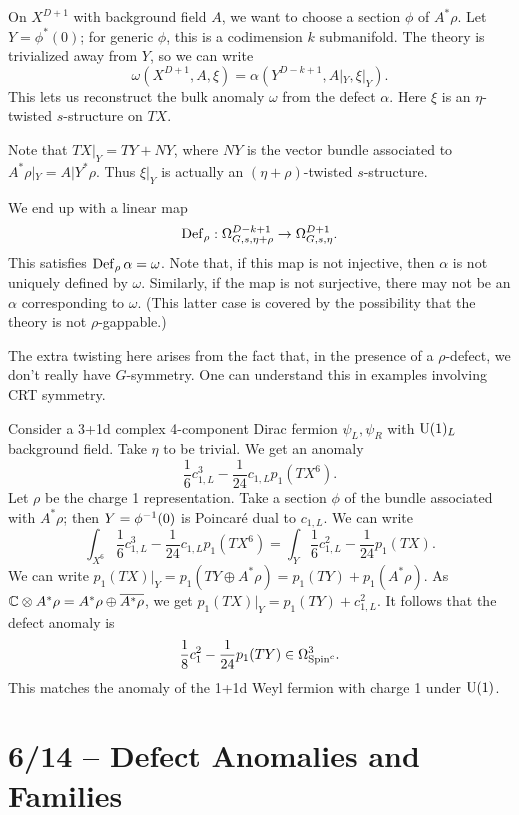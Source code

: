 On $X^{D+1}$ with background field $A$, we want to choose a section $\phi$ of $A^*\rho$.
Let $Y = \phi^*(0)$; for generic $\phi$, this is a codimension $k$ submanifold.
The theory is trivialized away from $Y$, so we can write
\[
	\omega(X^{D+1}, A, \xi) = \alpha(Y^{D-k+1}, A|_Y, \xi|_Y).
\]
This lets us reconstruct the bulk anomaly $\omega$ from the defect $\alpha$.
Here $\xi$ is an $\eta$-twisted $s$-structure on $TX$.

Note that $TX|_Y = TY + NY$, where $NY$ is the vector bundle associated to $A^*\rho|_Y = A|Y^* \rho$.
Thus $\xi|_Y$ is actually an $(\eta + \rho)$-twisted $s$-structure.

We end up with a linear map
\[
	\operatorname{Def}_\rho: \Omega^{D-k+1}_{G,s,\eta+\rho} \to \Omega^{D+1}_{G,s,\eta}.
\]
This satisfies $\operatorname{Def}_\rho \alpha = \omega$.
Note that, if this map is not injective, then $\alpha$ is not uniquely defined by $\omega$.
Similarly, if the map is not surjective, there may not be an $\alpha$ corresponding to $\omega$.
(This latter case is covered by the possibility that the theory is not $\rho$-gappable.)

The extra twisting here arises from the fact that, in the presence of a $\rho$-defect, we don't really have $G$-symmetry.
One can understand this in examples involving CRT symmetry.

\begin{ex}
	Consider a 3+1d complex 4-component Dirac fermion $\psi_L, \psi_R$ with $\mathrm{U}(1)_L$ background field.
	Take $\eta$ to be trivial.
	We get an anomaly
	\[
		\frac{1}{6} c_{1,L}^3 - \frac{1}{24} c_{1,L} p_1(TX^6).
	\]
	Let $\rho$ be the charge 1 representation.
	Take a section $\phi$ of the bundle associated with $A^* \rho$; then $Y = \phi^{-1}(0)$ is Poincar\'e dual to $c_{1,L}$.
	We can write
	\[
		\int_{X^6} \frac{1}{6} c_{1,L}^3 - \frac{1}{24} c_{1,L} p_1(TX^6) = \int_Y \frac{1}{6} c_{1,L}^2 - \frac{1}{24} p_1(TX).
	\]
	We can write $p_1(TX)|_Y = p_1(TY \oplus A^* \rho) = p_1(TY) + p_1(A^* \rho)$.
	As $\mathbb{C} \otimes A^* \rho = A^* \rho \oplus \overline{A^* \rho}$, we get $p_1(TX)|_Y = p_1(TY) + c_{1,L}^2$.
	It follows that the defect anomaly is
	\[
		\frac{1}{8} c_1^2 - \frac{1}{24} p_1(TY) \in \Omega^3_{\mathrm{Spin}^c}.
	\]
	This matches the anomaly of the 1+1d Weyl fermion with charge 1 under $\mathrm{U}(1)$.
\end{ex}

\section{6/14 -- Defect Anomalies and Families}

